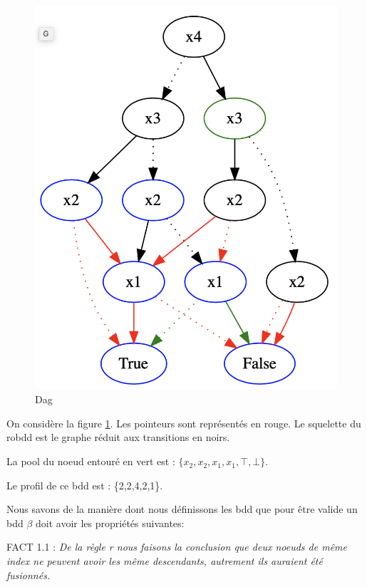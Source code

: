 \documentclass[french]{article}
\begin{document}
\begin{figure}[htp]
    \centering
    \includegraphics[scale=0.35]{tree21_new.png}
    \caption{Dag}
    \label{fig:tree21_new}
\end{figure}
On considère la figure \ref{fig:tree21_new}. Les pointeurs sont représentés en rouge. Le squelette du robdd est le graphe réduit aux transitions en noirs.

La pool du noeud entouré en vert est : \(\{x_2,x_2,x_1,x_1,\top,\bot\}\). 

Le profil de ce bdd est : \{2,2,4,2,1\}.

\vspace{5mm} 

Nous savons de la manière dont nous définissons les bdd que pour être valide un bdd \(\beta\) doit avoir les propriétés suivantes:

FACT 1.1 : \emph{De la règle r nous faisons la conclusion que deux noeuds de même index ne peuvent avoir les même descendants, autrement ils auraient été fusionnés.}
\end{document}
